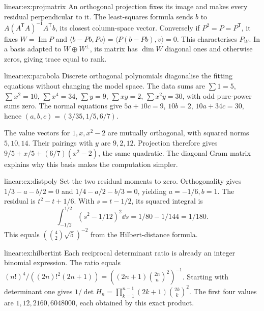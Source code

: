 \begin{solution}{linear:ex:projmatrix}
\idea An orthogonal projection fixes its image and makes every residual perpendicular to it.
\writeup The least-squares formula sends $b$ to $A(A^{\mathsf T}A)^{-1}A^{\mathsf T}b$, its closest column-space vector. Conversely if $P^2=P=P^{\mathsf T}$, it fixes $W=\operatorname{Im}P$ and $\langle b-Pb,Pv\rangle=\langle P(b-Pb),v\rangle=0$. This characterises $P_W$. In a basis adapted to $W\oplus W^\perp$, its matrix has $\dim W$ diagonal ones and otherwise zeros, giving trace equal to rank.
\end{solution}
\begin{solution}{linear:ex:parabola}
\idea Discrete orthogonal polynomials diagonalise the fitting equations without changing the model space.
\writeup The data sums are $\sum1=5$, $\sum x^2=10$, $\sum x^4=34$, $\sum y=9$, $\sum xy=2$, $\sum x^2y=30$, with odd pure-power sums zero. The normal equations give $5a+10c=9$, $10b=2$, $10a+34c=30$, hence $(a,b,c)=(3/35,1/5,6/7)$.

The value vectors for $1,x,x^2-2$ are mutually orthogonal, with squared norms $5,10,14$. Their pairings with $y$ are $9,2,12$. Projection therefore gives $9/5+x/5+(6/7)(x^2-2)$, the same quadratic. The diagonal Gram matrix explains why this basis makes the computation simpler.
\end{solution}
\begin{solution}{linear:ex:distpoly}
\idea Set the two residual moments to zero.
\writeup Orthogonality gives $1/3-a-b/2=0$ and $1/4-a/2-b/3=0$, yielding $a=-1/6,b=1$. The residual is $t^2-t+1/6$. With $s=t-1/2$, its squared integral is
\[\int_{-1/2}^{1/2}(s^2-1/12)^2\dd s=1/80-1/144=1/180.
\]
This equals $(\binom42\sqrt5)^{-2}$ from the Hilbert-distance formula.
\end{solution}
\begin{solution}{linear:ex:hilbertint}
\idea Each reciprocal determinant ratio is already an integer binomial expression.
\writeup The ratio equals $(n!)^4/((2n)!^2(2n+1))=((2n+1)\binom{2n}n^2)^{-1}$. Starting with determinant one gives $1/\det H_n=\prod_{k=1}^{n-1}(2k+1)\binom{2k}k^2$. The first four values are $1,12,2160,6048000$, each obtained by this exact product.
\end{solution}
